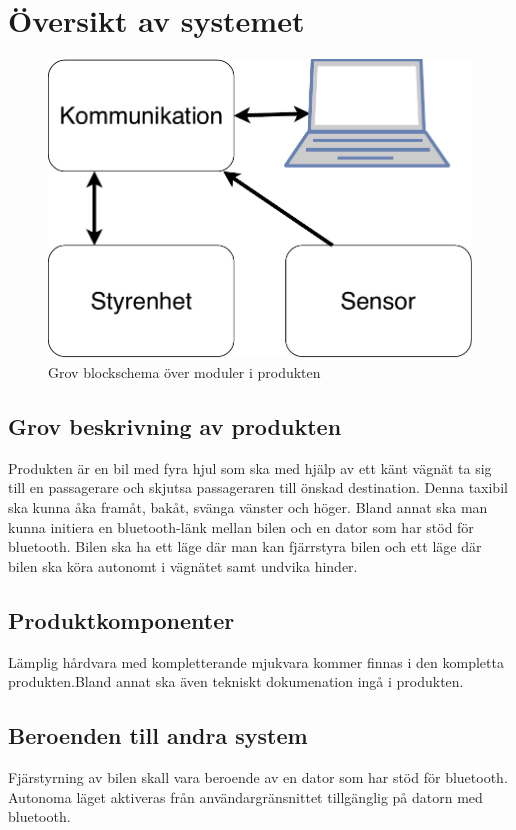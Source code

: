 \documentclass[kravspec/krav.tex]{subfiles}
\begin{document}
\section{Översikt av systemet}

\begin{figure}[h]
    \centering
    \includegraphics[width=0.6\linewidth]{kravspec/figures/overview-schema.pdf}
    \caption{Grov blockschema över moduler i produkten}
    \label{fig:overview}
\end{figure}

\subsection{Grov beskrivning av produkten}
Produkten är en bil med fyra hjul som ska med hjälp av ett känt vägnät ta sig
till en passagerare och skjutsa passageraren till önskad destination. Denna
taxibil ska kunna åka framåt, bakåt, svänga vänster och höger.  Bland annat ska
man kunna initiera en bluetooth-länk mellan bilen och en dator som har stöd för
bluetooth. Bilen ska ha ett läge där man kan fjärrstyra bilen och ett läge där
bilen ska köra autonomt i vägnätet samt undvika hinder.

\subsection{Produktkomponenter}
Lämplig hårdvara med kompletterande mjukvara kommer finnas i den kompletta
produkten.Bland annat ska även tekniskt dokumenation ingå i produkten.

\subsection{Beroenden till andra system}
Fjärstyrning av bilen skall vara beroende av en dator som har stöd för bluetooth.
Autonoma läget aktiveras från användargränsnittet tillgänglig på datorn med
bluetooth.
\end{document}
